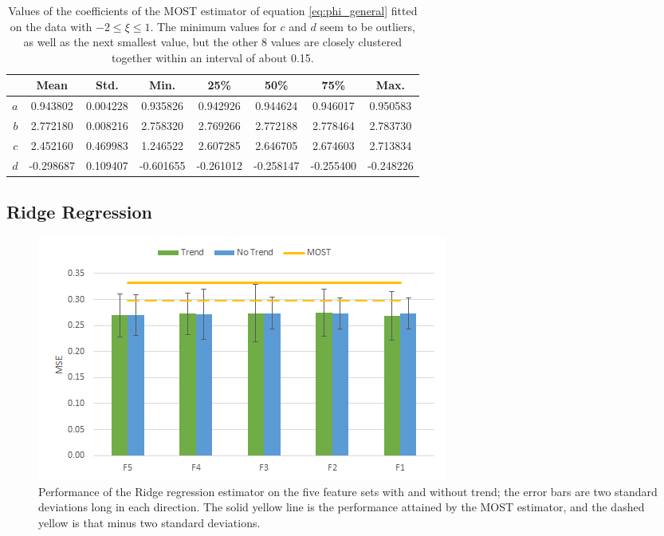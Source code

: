 \documentclass[12pt]{book}
\begin{document}
\begin{table}[]
\centering
\caption{Values of the coefficients of the MOST estimator of equation \ref{eq:phi_general} fitted on the data with $-2\leq\xi\leq1$. The minimum values for $c$ and $d$ seem to be outliers, as well as the next smallest value, but the other 8 values are closely clustered together within an interval of about 0.15.}
\label{tbl:most_coeffs}
\begin{tabular}{r|c|c|c|c|c|c|c}
   & Mean       & Std.       & Min.       & 25\%       & 50\%       & 75\%       & Max. \\ \hline
$a$   & 0.943802  & 0.004228  & 0.935826  & 0.942926  & 0.944624  & 0.946017  & 0.950583 \\
$b$   & 2.772180  & 0.008216  & 2.758320  & 2.769266  & 2.772188  & 2.778464  & 2.783730 \\
$c$   & 2.452160  & 0.469983  & 1.246522  & 2.607285  & 2.646705  & 2.674603  & 2.713834 \\
$d$   & -0.298687  & 0.109407 & -0.601655 & -0.261012 & -0.258147 & -0.255400 & -0.248226
\end{tabular}
\end{table}


\subsection{Ridge Regression}

\begin{figure}
\centering
\includegraphics[width=\textwidth]{images/ridge_results}
\caption{Performance of the Ridge regression estimator on the five feature sets with and without trend; the error bars are two standard deviations long in each direction. The solid yellow line is the performance attained by the MOST estimator, and the dashed yellow is that minus two standard deviations.}
\label{fig:ridge_results}
\end{figure}
\end{document}
